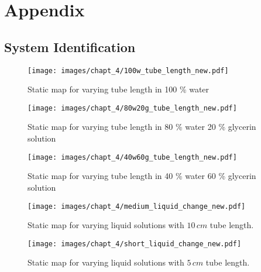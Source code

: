 \chapter{Appendix}
\section{System Identification}\label{A1}
\begin{figure}[ht]
  \texttt{[image: images/chapt\_4/100w\_tube\_length\_new.pdf]}
  \caption[Static map for different tube length in 100 \% water]{Static map for varying tube length in 100 \% water}
  \label{fig:anh_1}
\end{figure}

\begin{figure}[ht]
  \texttt{[image: images/chapt\_4/80w20g\_tube\_length\_new.pdf]}
  \caption[Static map for different tube length in 80 \% water 20 \% glycerin solution]{Static map for varying tube length in 80 \% water 20 \% glycerin solution}
 \label{fig:anh_2}
\end{figure}

\begin{figure}[ht]
  \texttt{[image: images/chapt\_4/40w60g\_tube\_length\_new.pdf]}
  \caption[Static map for different tube length in 40 \% water 60 \% glycerin solution]{Static map for varying tube length in 40 \% water 60 \% glycerin solution}
    \label{fig:anh_3}
\end{figure}

\begin{figure}[ht]
  \texttt{[image: images/chapt\_4/medium\_liquid\_change\_new.pdf]}
  \caption[Static map for varying liquid solutions with $10\,cm$ tube length]{Static map for varying liquid solutions with $10\,cm$ tube length.}
    \label{fig:anh_4}
\end{figure}

\begin{figure}[ht]
  \texttt{[image: images/chapt\_4/short\_liquid\_change\_new.pdf]}
  \caption[Static map for varying liquid solutions with $5\,cm$ tube length]{Static map for varying liquid solutions with $5\,cm$ tube length.}
    \label{fig:anh_5}
\end{figure}
